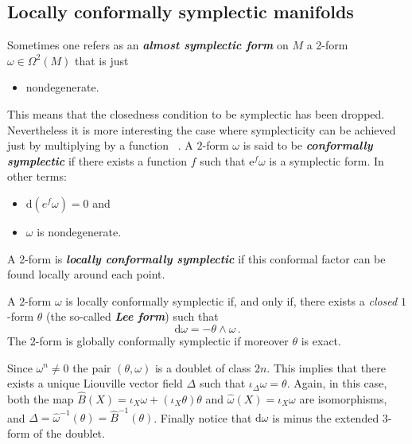 \documentclass[11pt,twoside]{article}
\theoremstyle{plain}
\theoremstyle{definition}
\renewcommand{\d}{\mathrm{d}}
\newcommand{\Cinfty}{\mathscr{C}^\infty}
\newcommand*{\inn}[1]{\iota_{#1}}
\def\d{\mathrm{d}}
\newcommand\dfn[1]{{\textbf{\emph{#1}}}}
\def\d{\mathrm{d}}
\begin{document}
\subsection{Locally conformally symplectic manifolds}

Sometimes one refers as an
\dfn{almost symplectic form} on $M$ 
a 2-form $\omega\in \Omega^2(M)$ 
that is just
\begin{itemize}
\item 
nondegenerate.
\end{itemize}
This means that the closedness condition to be symplectic 
has been dropped. 
Nevertheless it is more interesting the case where symplecticity can be achieved just by multiplying by a function~%
\cite{CG_2025}.
A $2$-form $\omega$ is said to be \dfn{conformally symplectic} 
if there exists a function $f$ such that 
$\mathrm{e}^f \omega$
is a symplectic form.
In other terms:
\begin{itemize}
\item 
$\d (e^f \omega) = 0$ and
\item 
$\omega$ is nondegenerate.
\end{itemize}
A 2-form is \dfn{locally conformally symplectic}
if this conformal factor can be found locally around each point.




A $2$-form $\omega$ is locally conformally symplectic if, and only if, there exists a \emph{closed} $1$-form $\theta$ 
(the so-called \dfn{Lee form}) 
such that
$$
\d \omega = - \theta \wedge \omega\,.
$$
The 2-form is globally conformally symplectic if moreover $\theta$ is exact.

Since $\omega^n\neq 0$ 
the pair $(\theta, \omega)$ is a doublet of class $2n$. 
This implies that there exists a unique Liouville vector field 
$\Delta$ such that 
$\inn{\Delta} \omega  = \theta$.
Again, in this case, both the map 
$\widehat B(X) = \inn{X} \omega + (\inn{X} \theta) \theta$ and 
$\widehat\omega(X) = \inn{X} \omega $ 
are isomorphisms, and 
$\Delta = \widehat\omega^{-1} (\theta)= \widehat B^{-1}(\theta)$.
Finally notice that $\d\omega$ is minus the extended 3-form of the doublet.
\end{document}
